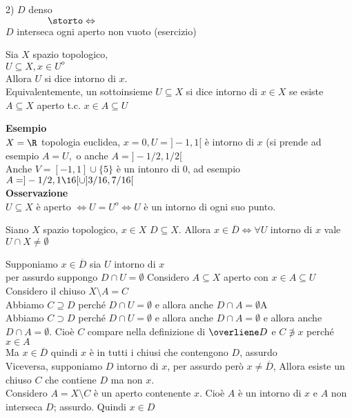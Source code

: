 \documentclass{article}
\begin{document}
	   2) $D$ denso\\
	   $\text{}\ \ \ \ \ \ \ \ \ \ \ \ \ \storto \Leftrightarrow$\\
	   $D$ interseca ogni aperto non vuoto (esercizio)
	   \begin{defi}
	   	Sia $X$ spazio topologico,\\
		$U\subseteq X, x\in U^o$\\
		Allora  $U$ si dice intorno di $x$.\\
		Equivalentemente, un sottoinsieme $U\subseteq X$ si dice intorno di $x\in X$ se esiste  $A\subseteq X$ aperto t.c. $x\in A\subseteq U$
	   \end{defi}
	   \textbf{Esempio}\\
	   $X = \R$ topologia euclidea,  $x = 0, U = ]-1,1[$ è intorno di  $x$ (si prende ad esempio $A = U, $ o anche $A = ]-1/2,1/2[$\\
	   Anche $V = [-1,1]\cup \{5\}$ è un intonro di 0, ad esempio  $A = ]-1/2, 1\16[\cup]3/16,7/16[$\\
	    \textbf{Osservazione}\\
	    $U\subseteq X$ è aperto  $ \Leftrightarrow U = U^o \Leftrightarrow U$ è  un intorno di ogni suo punto.
	    \begin{lemm}
Siano $X$ spazio topologico, $x\in X$ $D\subseteq X.$ Allora $x\in\overline D \Leftrightarrow \forall U$ intorno di $x$ vale $U\cap X \neq\emptyset$
	    \end{lemm}
	    \begin{dimo}
	    Supponiamo $x\in\overline D$ sia $U$ intorno di $x$\\
	    per assurdo suppongo  $D\cap U = \emptyset$
	    Considero  $A  \subseteq X$ aperto con $x\in A\subseteq U$\\
	    Considero il chiuso  $X\setminus A = C$\\
	    Abbiamo  $C\supseteq D$ perché  $D\cap U = \emptyset$ e allora anche $D\cap A = \emptyset$A\\
	    Abbiamo  $C\supset D$ perché  $D\cap U = \emptyset$ e allora anche  $D\cap A = \emptyset $ e allora anche $D\cap A = \emptyset$. Cioè $C$ compare nella definizione di $\overliene D $ e $C\not\ni x$ perché  $x\in A$\\
	    Ma  $x\in\overline D$ quindi  $x$ è in tutti i chiusi che contengono $D$, assurdo\\
	    Viceversa, supponiamo $D$ intorno di $x$, per assurdo però $x\neq \overline D$, Allora esiste un chiuso  $C$ che contiene $D$ ma non $x$.\\
	    Considero  $A = X\setminus C$ è un aperto contenente  $x$. Cioè $A$ è un intorno di $x$ e $A$ non interseca $D$; assurdo. Quindi $x\in D$ 
	    \end{dimo}
\end{document}
